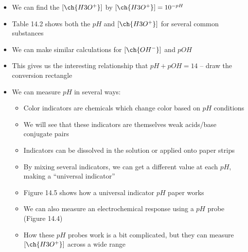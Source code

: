 \documentclass[12pt, openany, letterpaper]{memoir}
\begin{document}
\begin{itemize}
	\item We can find the $\left[\ch{H3O^+}\right]$ by $\left[\ch{H3O^+}\right]=10^{-pH}$
	\item Table 14.2 shows both the $pH$ and $\left[\ch{H3O^+}\right]$ for several common substances
	\item We can make similar calculations for $\left[\ch{OH^-}\right]$ and $pOH$
	\item This gives us the interesting relationship that $pH+pOH=14$ -- draw the conversion rectangle
	\item We can measure $pH$ in several ways:
	\begin{itemize}
		\item Color indicators are chemicals which change color based on $pH$ conditions
		\item We will see that these indicators are themselves weak acids/base conjugate pairs
		\item Indicators can be dissolved in the solution or applied onto paper strips
		\item By mixing several indicators, we can get a different value at each $pH$, making a ``universal indicator''
		\item Figure 14.5 shows how a universal indicator $pH$ paper works
		\item We can also measure an electrochemical response using a $pH$ probe (Figure 14.4)
		\item How these $pH$ probes work is a bit complicated, but they can measure $\left[\ch{H3O^+}\right]$ across a wide range
	\end{itemize}
\end{itemize}
\end{document}
